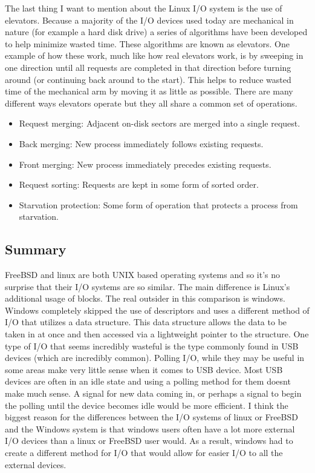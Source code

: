 \documentclass[a4paper,10pt,onecolumn]{article}
\begin{document}
\newline
The last thing I want to mention about the Linux I/O system is the use of elevators. Because a majority of the I/O devices used today are mechanical in nature (for example a hard disk drive) a series of algorithms have been developed to help minimize wasted time. These algorithms are known as elevators. One example of how these work, much like how real elevators work, is by sweeping in one direction until all requests are completed in that direction before turning around (or continuing back around to the start). This helps to reduce wasted time of the mechanical arm by moving it as little as possible.
\newline 
There are many different ways elevators operate but they all share a common set of operations. 
\begin{itemize}
\item Request merging: Adjacent on-disk sectors are merged into a single request.
\item Back merging: New process immediately follows existing requests.
\item Front merging: New process immediately precedes existing requests.
\item Request sorting: Requests are kept in some form of sorted order.
\item Starvation protection: Some form of operation that protects a process from starvation.
\end{itemize}

\subsection{Summary}
FreeBSD and linux are both UNIX based operating systems and so it's no surprise that their I/O systems are so similar. The main difference is Linux's additional usage of blocks. The real outsider in this comparison is windows. Windows completely skipped the use of descriptors and uses a different method of I/O that utilizes a data structure. This data structure allows the data to be taken in at once and then accessed via a lightweight pointer to the structure.
\newline
\newline
One type of I/O that seems incredibly wasteful is the type commonly found in USB devices (which are incredibly common). Polling I/O, while they may be useful in some areas make very little sense when it comes to USB device. Most USB devices are often in an idle state and using a polling method for them doesnt make much sense. A signal for new data coming in, or perhaps a signal to begin the polling until the device becomes idle would be more efficient.
\newline
I think the biggest reason for the differences between the I/O systems of linux or FreeBSD and the Windows system is that windows users often have a lot more external I/O devices than a linux or FreeBSD user would. As a result, windows had to create a different method for I/O that would allow for easier I/O to all the external devices. 
\end{document}
